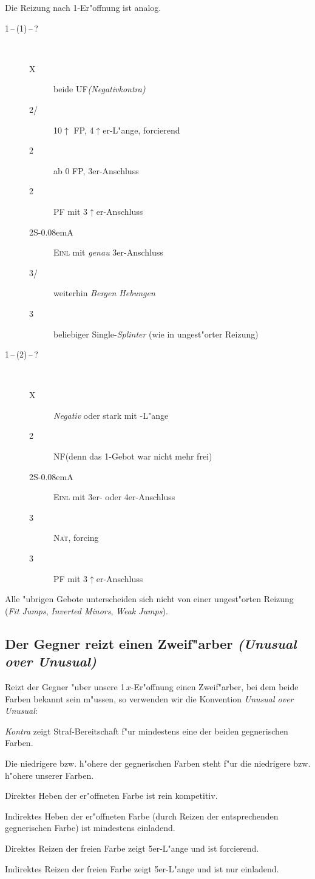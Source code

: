 \documentclass[11pt,german,twocolumn]{scrartcl}
\def\pik{\nobreak\hspace{\cardskip}\Sp\xspace}
\def\coe{\nobreak\hspace{\cardskip}\He\xspace}
\def\kar{\nobreak\hspace{\cardskip}\Di\xspace}
\def\tre{\nobreak\hspace{\cardskip}\Cl\xspace}
\def\ka{\Di\xspace}
\def\pl{$\uparrow$\xspace}
\def\ufa{\nobreak\textsf{UF}\xspace}
\def\sa{\nobreak\textsf{S\kern-0.08emA}\xspace}
\def\SA{\nobreak\hspace{\cardskip}\sa}
\def\kontra{\textsf{X}\xspace}
\def\sep{\,--\,}
\newcommand{\conv}[1]{\emph{#1}}
\def\nat{\textsc{Nat}\xspace}
\def\pf{\textsc{PF}\xspace}
\def\inv{\textsc{Einl}\xspace}
\def\nf{\textsc{NF}\xspace}
\def\bdsc{\begin{description}}
\def\edsc{\end{description}}
\begin{document}
Die Reizung nach 1\kar-Er"offnung ist analog.

\bdsc
\item[1\coe{}\sep(1\pik){}\sep?]~
\bdsc
\item[\kontra] beide \ufa \conv{(Negativkontra)}
\item[2\tre/\ka] 10\pl FP, 4\pl{}er-L"ange, forcierend
\item[2\coe] ab 0 FP, 3er-Anschluss
\item[2\pik] \pf mit 3\pl{}er-Anschluss
\item[2\SA] \inv mit \emph{genau} 3er-Anschluss
\item[3\tre/\ka] weiterhin \conv{Bergen Hebungen}
\item[3\pik] beliebiger Single-\conv{Splinter} (wie in ungest"orter
  Reizung)
\edsc
\item[1\coe{}\sep(2\kar){}\sep?]~
\bdsc
\item[\kontra] \conv{Negativ} oder stark mit \pik-L"ange
\item[2\pik] \nf (denn das 1\pik-Gebot war nicht mehr frei)
\item[2\SA] \inv mit 3er- oder 4er-Anschluss
\item[3\tre] \nat, forcing
\item[3\kar] \pf mit 3\pl{}er-Anschluss
\edsc
\edsc

Alle "ubrigen Gebote unterscheiden sich nicht von einer ungest"orten
Reizung (\conv{Fit Jumps}, \conv{Inverted Minors}, \conv{Weak Jumps}).

\subsection{Der Gegner reizt einen Zweif"arber \conv{(Unusual over
    Unusual)}}

Reizt der Gegner "uber unsere 1\,$x$-Er"offnung einen Zweif"arber, bei
dem beide Farben bekannt sein m"ussen, so verwenden wir die Konvention
\conv{Unusual over Unusual}:
\begin{compactitem}
\item \conv{Kontra} zeigt Straf-Bereitschaft f"ur mindestens eine der
  beiden gegnerischen Farben.
\item Die niedrigere bzw. h"ohere der gegnerischen Farben steht
  f"ur die niedrigere bzw. h"ohere unserer Farben.
\item Direktes Heben der er"offneten Farbe ist rein kompetitiv.
\item Indirektes Heben der er"offneten Farbe (durch Reizen der
  entsprechenden gegnerischen Farbe) ist mindestens einladend.
\item Direktes Reizen der freien Farbe zeigt 5er-L"ange und ist
  forcierend.
\item Indirektes Reizen der freien Farbe zeigt 5er-L"ange und ist nur
  einladend.
\end{compactitem}
\end{document}
